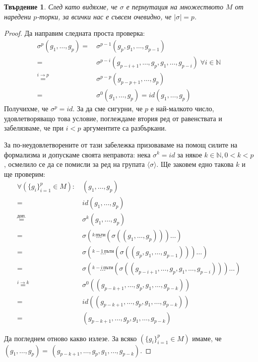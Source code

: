 \documentclass{article}
\newtheorem*{prop}{Твърдение}
\theoremstyle{definition}
\newcommand{\grsigma}[0]{{\langle \sigma \rangle}}
\begin{document}
\begin{prop}
    След като видяхме, че $\sigma$ е пермутация на множеството $M$ от наредени $p$-торки, за всички нас е съвсем очевидно, че $|\sigma| = p$.
\end{prop}
\begin{proof}
    Да направим следната проста проверка:
\begin{align*}
    \sigma^p(g_1,\dots, g_p) =\,&\sigma^{p-1}(g_p, g_1,\dots, g_{p-1}) \\
                             =\,&\sigma^{p-i}(g_{p-i+1},\dots,g_p,g_1,\dots,g_{p-i})\;\forall i\in\mathbb N\\
                             \overset{i \rightarrow p}{=}\,&\sigma^{p-p}(g_{p-p+1},\dots,g_p)\\
                             =\,&\sigma^{0}(g_{1},\dots,g_p) = id(g_{1},\dots,g_p)
\end{align*}
Получихме, че $\sigma^p = id$.
За да сме сигурни, че $p$ е най-малкото число, удовлетворяващо това условие,
поглеждаме втория ред от равенствата и забелязваме, че при $i<p$ аргументите са разбъркани.

За по-неудовлетворените от тази забележка призоваваме на помощ силите на формализма и допускаме своята неправота: нека $\sigma^k = id$ за някое $k \in \mathbb N, 0 < k < p$, осмелило се да се помисли за ред на групата $\grsigma$.
Ще заковем едно такова $k$ и ще проверим:
\begin{align*}
    \forall (\{g_i\}_{i=1}^p \in M)\!:\, &(g_1,\dots, g_p) \\
   =\,&id(g_1,\dots, g_p) \\
   \overset{\textit{доп.}}{=}\,&\sigma^k(g_1, \dots, g_p)\\
   =\,&\sigma(\overset{k\,\text{пъти}}{\dots}   ( \sigma( (g_1,\dots, g_p)))\dots)\\
   =\,&\sigma(\overset{k-1\,\text{пъти}}{\dots} ( \sigma( (g_p, g_1,\dots, g_{p-1})))\dots)\\
   =\,&\sigma(\overset{k-i\,\text{пъти}}{\dots} ( \sigma( (g_{p-i+1}, \dots, g_p, g_1,\dots, g_{p-i})))\dots)\\
   \overset{i\rightarrow k}{=}\,&\sigma^0( (g_{p-k+1}, \dots, g_p, g_1,\dots, g_{p-k})) \\
   =\,&id( (g_{p-k+1}, \dots, g_p, g_1,\dots, g_{p-k}))\\
   =\,&(g_{p-k+1}, \dots, g_p, g_1,\dots, g_{p-k})
\end{align*}

Да погледнем отново какво излезе.
За всяко $(\{g_i\}_{i=1}^p \in M)$ имаме, че $(g_1,\dots, g_p) =\,(g_{p-k+1}, \dots, g_p, g_1,\dots, g_{p-k})$.


\end{proof}
\end{document}
